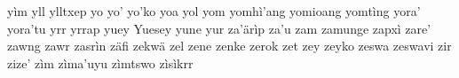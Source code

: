 \documentclass[a4paper]{article}
\begin{document}
yìm\hspace{2mm}
yll\hspace{2mm}
ylltxep\hspace{2mm}
yo\hspace{2mm}
yo'\hspace{2mm}
yo'ko\hspace{2mm}
yoa\hspace{2mm}
yol\hspace{2mm}
yom\hspace{2mm}
yomhì'ang\hspace{2mm}
yomioang\hspace{2mm}
yomtìng\hspace{2mm}
yora'\hspace{2mm}
yora'tu\hspace{2mm}
yrr\hspace{2mm}
yrrap\hspace{2mm}
yuey\hspace{2mm}
Yuesey\hspace{2mm}
yune\hspace{2mm}
yur\hspace{2mm}
za'ärìp\hspace{2mm}
za'u\hspace{2mm}
zam\hspace{2mm}
zamunge\hspace{2mm}
zapxì\hspace{2mm}
zare'\hspace{2mm}
zawng\hspace{2mm}
zawr\hspace{2mm}
zasrìn\hspace{2mm}
zäfi\hspace{2mm}
zekwä\hspace{2mm}
zel\hspace{2mm}
zene\hspace{2mm}
zenke\hspace{2mm}
zerok\hspace{2mm}
zet\hspace{2mm}
zey\hspace{2mm}
zeyko\hspace{2mm}
zeswa\hspace{2mm}
zeswavi\hspace{2mm}
zir\hspace{2mm}
zize'\hspace{2mm}
zìm\hspace{2mm}
zìma'uyu\hspace{2mm}
zìmtswo\hspace{2mm}
zìsìkrr\hspace{2mm}
\end{document}
